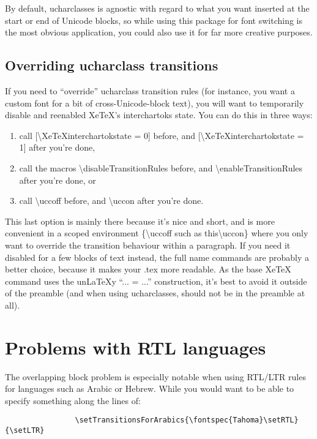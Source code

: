 ﻿\documentclass{article}
\newenvironment{numberlist}{%
  \begin{enumerate}
	\setlength{\itemsep}{0pt}
	\setlength{\parsep}{0pt}
	\setlength{\topsep}{0pt}
	\setlength{\partopsep}{0pt}
	\setlength{\parskip}{0pt}
	\setlength{\labelsep}{5pt}}%
{
  \end{enumerate}}
\begin{document}
		By default, ucharclasses is agnostic with regard to what you want inserted at the start or end of Unicode blocks, so while using this package for font switching is the most obvious application, you could also use it for far more creative purposes.

		\subsection{Overriding ucharclass transitions}
		
			If you need to “override” ucharclass transition rules (for instance, you want a custom font for a bit of cross-Unicode-block text), you will want to temporarily disable and reenabled XeTeX's interchartoks state. You can do this in three ways:
			
			\begin{numberlist}
				\item call [\textbackslash XeTeXinterchartokstate = 0] before, and [\textbackslash XeTeXinterchartokstate = 1] after you're done,
				\item call the macros \textbackslash disableTransitionRules before, and \textbackslash enableTransitionRules after you're done, or
				\item call \textbackslash uccoff before, and \textbackslash uccon after you're done.
			\end{numberlist}
			
			This last option is mainly there because it's nice and short, and is more convenient in a scoped environment \{\textbackslash uccoff such as this\textbackslash uccon\} where you only want to override the transition behaviour within a paragraph. If you need it disabled for a few blocks of text instead, the full name commands are probably a better choice, because it makes your .tex more readable. As the base XeTeX command uses the un\LaTeX y “... = ...” construction, it's best to avoid it outside of the preamble (and when using ucharclasses, should not be in the preamble at all).

	\section{Problems with RTL languages}

		The overlapping block problem is especially notable when using RTL/LTR rules for languages such as Arabic or Hebrew. While you would want to be able to specify something along the lines of:
		
		\begin{verbatim}
				\setTransitionsForArabics{\fontspec{Tahoma}\setRTL}{\setLTR}
		\end{verbatim}
	
\end{document}
